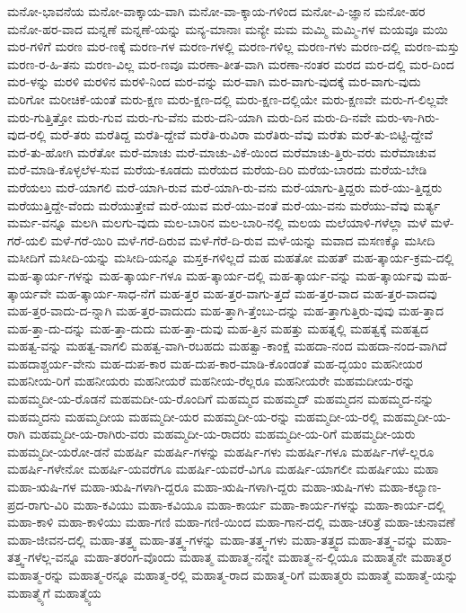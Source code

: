 {ಮನೋ-ಭಾವನೆಯ
ಮನೋ-ವಾಕ್ಕಾಯ-ವಾಗಿ
ಮನೋ-ವಾ-ಕ್ಕಾಯ-ಗಳಿಂದ
ಮನೋ-ವಿ-ಜ್ಞಾನ
ಮನೋ-ಹರ
ಮನೋ-ಹರ-ವಾದ
ಮನ್ನಣೆ
ಮನ್ನಣೆ-ಯನ್ನು
ಮನ್ಯ-ಮಾನಾಃ
ಮನ್ಯೇ
ಮಮ
ಮಮ್ಮಿ
ಮಮ್ಮಿ-ಗಳ
ಮಯವೂ
ಮಯಿ
ಮರ-ಗಳಿಗೆ
ಮರಣ
ಮರ-ಣಕ್ಕೆ
ಮರಣ-ಗಳ
ಮರಣ-ಗಳಲ್ಲಿ
ಮರಣ-ಗಳಿಲ್ಲ
ಮರಣ-ಗಳು
ಮರಣ-ದಲ್ಲಿ
ಮರಣ-ಮಸ್ತು
ಮರಣ-ರ-ಹಿ-ತನು
ಮರಣ-ವಿಲ್ಲ
ಮರ-ಣವೂ
ಮರಣಾ-ತೀತ-ವಾಗಿ
ಮರಣಾ-ನಂತರ
ಮರದ
ಮರ-ದಲ್ಲಿ
ಮರ-ದಿಂದ
ಮರ-ಳನ್ನು
ಮರಳಿ
ಮರಳಿನ
ಮರಳಿ-ನಿಂದ
ಮರ-ವನ್ನು
ಮರ-ವಾಗಿ
ಮರ-ವಾಗು-ವುದಕ್ಕೆ
ಮರ-ವಾಗು-ವುದು
ಮರಿಗೋ
ಮರೀಚಿಕೆ-ಯಂತೆ
ಮರು-ಕ್ಷಣ
ಮರು-ಕ್ಷಣ-ದಲ್ಲಿ
ಮರು-ಕ್ಷಣ-ದಲ್ಲಿಯೇ
ಮರು-ಕ್ಷಣವೇ
ಮರು-ಗ-ಲಿಲ್ಲವೇ
ಮರು-ಗುತ್ತಿತ್ತೋ
ಮರು-ಗುವ
ಮರು-ಗು-ವೆನು
ಮರು-ದನಿ-ಯಾಗಿ
ಮರು-ದಿನ
ಮರು-ದಿ-ನವೇ
ಮರು-ಳಾ-ಗಿರು-ವುದ-ರಲ್ಲಿ
ಮರೆ-ತರು
ಮರೆತಿದ್ದ
ಮರೆತಿ-ದ್ದೇವೆ
ಮರೆತಿ-ರುವಿರಾ
ಮರೆತಿರು-ವೆವು
ಮರೆತು
ಮರೆ-ತು-ಬಿಟ್ಟಿ-ದ್ದೇವೆ
ಮರೆ-ತು-ಹೋಗಿ
ಮರೆತೋ
ಮರೆ-ಮಾಚು
ಮರೆ-ಮಾಚು-ವಿಕೆ-ಯಿಂದ
ಮರೆಮಾಚು-ತ್ತಿರು-ವರು
ಮರೆಮಾಚುವ
ಮರೆ-ಮಾಡಿ-ಕೊಳ್ಳಲೆಳ-ಸುವ
ಮರೆಯ-ಕೂಡದು
ಮರೆಯದ
ಮರೆಯ-ದಿರಿ
ಮರೆಯ-ಬಾರದು
ಮರೆಯ-ಬೇಡಿ
ಮರೆಯಲು
ಮರೆ-ಯಾಗಲಿ
ಮರೆ-ಯಾಗಿ-ರುವ
ಮರೆ-ಯಾಗಿ-ರು-ವನು
ಮರೆ-ಯಾಗು-ತ್ತಿದ್ದರು
ಮರೆ-ಯು-ತ್ತಿದ್ದರು
ಮರೆಯುತ್ತಿದ್ದೇ-ವೆಂದು
ಮರೆಯುತ್ತೇವೆ
ಮರೆ-ಯುವ
ಮರೆ-ಯು-ವಂತೆ
ಮರೆ-ಯು-ವನು
ಮರೆಯು-ವೆವು
ಮರ್ತ್ಯ
ಮರ್ಮ-ವನ್ನೂ
ಮಲಗಿ
ಮಲಗು-ವುದು
ಮಲ-ಬಾರಿನ
ಮಲ-ಬಾರಿ-ನಲ್ಲಿ
ಮಲಯ
ಮಲೆಯಾಳಿ-ಗಳೆಲ್ಲಾ
ಮಳೆ
ಮಳೆ-ಗರೆ-ಯಲಿ
ಮಳೆ-ಗರೆ-ಯಿರಿ
ಮಳೆ-ಗರೆ-ದಿರುವ
ಮಳೆ-ಗೆರೆ-ದಿ-ರುವ
ಮಳೆ-ಯನ್ನು
ಮವಾದ
ಮಸಣಕ್ಕೊ
ಮಸೀದಿ
ಮಸೀದಿಗೆ
ಮಸೀದಿ-ಯನ್ನು
ಮಸೀದಿ-ಯನ್ನೂ
ಮಸ್ತಕ-ಗಳಿಲ್ಲದೆ
ಮಹ
ಮಹತೋ
ಮಹತ್
ಮಹ-ತ್ಕಾರ್ಯ-ಕ್ರಮ-ದಲ್ಲಿ
ಮಹ-ತ್ಕಾರ್ಯ-ಗಳನ್ನು
ಮಹ-ತ್ಕಾರ್ಯ-ಗಳೂ
ಮಹ-ತ್ಕಾರ್ಯ-ದಲ್ಲಿ
ಮಹ-ತ್ಕಾರ್ಯ-ವನ್ನು
ಮಹ-ತ್ಕಾರ್ಯವು
ಮಹ-ತ್ಕಾರ್ಯವೇ
ಮಹ-ತ್ಕಾರ್ಯ-ಸಾಧ-ನೆಗೆ
ಮಹ-ತ್ತರ
ಮಹ-ತ್ತರ-ವಾಗು-ತ್ತದೆ
ಮಹ-ತ್ತರ-ವಾದ
ಮಹ-ತ್ತರ-ವಾದವು
ಮಹ-ತ್ತರ-ವಾದು-ದ-ನ್ನಾಗಿ
ಮಹ-ತ್ತರ-ವಾದುದು
ಮಹ-ತ್ತಾಗಿ-ತ್ತೆಂಬು-ದನ್ನು
ಮಹ-ತ್ತಾಗುತ್ತಿರು-ವುವು
ಮಹ-ತ್ತಾದ
ಮಹ-ತ್ತಾ-ದು-ದನ್ನು
ಮಹ-ತ್ತಾ-ದುದು
ಮಹ-ತ್ತಾ-ದುವು
ಮಹ-ತ್ತಿನ
ಮಹತ್ತು
ಮಹತ್ನಲ್ಲಿ
ಮಹತ್ವಕ್ಕೆ
ಮಹತ್ವದ
ಮಹತ್ವ-ವನ್ನು
ಮಹತ್ವ-ವಾಗಲಿ
ಮಹತ್ವ-ವಾಗಿ-ರಬಹದು
ಮಹತ್ವಾ-ಕಾಂಕ್ಷೆ
ಮಹದಾ-ನಂದ
ಮಹದಾ-ನಂದ-ವಾಗಿದೆ
ಮಹದಾಶ್ಚರ್ಯ-ವೇನು
ಮಹ-ದುಪ-ಕಾರ
ಮಹ-ದುಪ-ಕಾರ-ಮಾಡಿ-ಕೊಂಡಂತೆ
ಮಹ-ದ್ಭಯಂ
ಮಹನೀಯರ
ಮಹನೀಯ-ರಿಗೆ
ಮಹನೀಯರು
ಮಹನೀಯರೆ
ಮಹನೀಯ-ರೆಲ್ಲರೂ
ಮಹನೀಯರೇ
ಮಹಮದೀಯ-ರನ್ನು
ಮಹಮ್ಮದೀ-ಯ-ರೊಡನೆ
ಮಹಮದೀ-ಯ-ರೊಂದಿಗೆ
ಮಹಮ್ಮದ
ಮಹಮ್ಮದ್
ಮಹಮ್ಮದನ
ಮಹಮ್ಮದ-ನನ್ನು
ಮಹಮ್ಮದನು
ಮಹಮ್ಮದೀಯ
ಮಹಮ್ಮದೀ-ಯರ
ಮಹಮ್ಮದೀ-ಯ-ರನ್ನು
ಮಹಮ್ಮದೀ-ಯ-ರಲ್ಲಿ
ಮಹಮ್ಮದೀ-ಯ-ರಾಗಿ
ಮಹಮ್ಮದೀ-ಯ-ರಾಗಿರು-ವರು
ಮಹಮ್ಮದೀ-ಯ-ರಾದರು
ಮಹಮ್ಮದೀ-ಯ-ರಿಗೆ
ಮಹಮ್ಮದೀ-ಯರು
ಮಹಮ್ಮದೀ-ಯರೋ-ಡನೆ
ಮಹರ್ಷಿ
ಮಹರ್ಷಿ-ಗಳನ್ನು
ಮಹರ್ಷಿ-ಗಳು
ಮಹರ್ಷಿ-ಗಳೂ
ಮಹರ್ಷಿ-ಗಳೆ-ಲ್ಲರೂ
ಮಹರ್ಷಿ-ಗಳೇನೋ
ಮಹರ್ಷಿ-ಯವರೆಗೂ
ಮಹರ್ಷಿ-ಯವರೆ-ವಿಗೂ
ಮಹರ್ಷಿ-ಯಾಗಲೀ
ಮಹರ್ಷಿಯು
ಮಹಾ
ಮಹಾ-ಋಷಿ-ಗಳ
ಮಹಾ-ಋಷಿ-ಗಳಾಗಿ-ದ್ದರೂ
ಮಹಾ-ಋಷಿ-ಗಳಾಗಿ-ದ್ದರು
ಮಹಾ-ಋಷಿ-ಗಳು
ಮಹಾ-ಕಲ್ಯಾಣ-ಪ್ರದ-ರಾಗು-ವಿರಿ
ಮಹಾ-ಕವಿಯು
ಮಹಾ-ಕವಿಯೂ
ಮಹಾ-ಕಾರ್ಯ
ಮಹಾ-ಕಾರ್ಯ-ಗಳನ್ನು
ಮಹಾ-ಕಾರ್ಯ-ದಲ್ಲಿ
ಮಹಾ-ಕಾಳಿ
ಮಹಾ-ಕಾಳಿಯು
ಮಹಾ-ಗಣಿ
ಮಹಾ-ಗಣಿ-ಯಿಂದ
ಮಹಾ-ಗಾನ-ದಲ್ಲಿ
ಮಹಾ-ಚರಿತ್ರೆ
ಮಹಾ-ಚುನಾವಣೆ
ಮಹಾ-ಜೀವನ-ದಲ್ಲಿ
ಮಹಾ-ತತ್ತ್ವ
ಮಹಾ-ತತ್ತ್ವ-ಗಳನ್ನು
ಮಹಾ-ತತ್ತ್ವ-ಗಳು
ಮಹಾ-ತತ್ತ್ವದ
ಮಹಾ-ತತ್ತ್ವ-ವನ್ನು
ಮಹಾ-ತತ್ತ್ವ-ಗಳೆಲ್ಲ-ವನ್ನೂ
ಮಹಾ-ತರಂಗ-ವೊಂದು
ಮಹಾತ್ಮ
ಮಹಾತ್ಮ-ನನ್ನೇ
ಮಹಾತ್ಮ-ನ-ಲ್ಲಿಯೂ
ಮಹಾತ್ಮನೇ
ಮಹಾತ್ಮರ
ಮಹಾತ್ಮ-ರನ್ನು
ಮಹಾತ್ಮ-ರನ್ನೂ
ಮಹಾತ್ಮ-ರಲ್ಲಿ
ಮಹಾತ್ಮ-ರಾದ
ಮಹಾತ್ಮ-ರಿಗೆ
ಮಹಾತ್ಮರು
ಮಹಾತ್ಮೆ
ಮಹಾತ್ಮೆ-ಯನ್ನು
ಮಹಾತ್ಮ್ಯೆಗೆ
ಮಹಾತ್ಮ್ಯೆಯ
}
